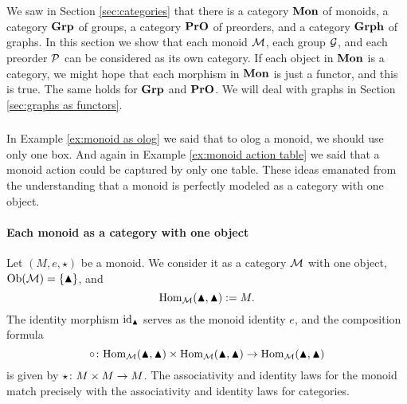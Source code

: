 

\section{}


\subsection{}\label{sec:mon grp pro as cat}

We saw in Section \ref{sec:categories} that there is a category ${\bf Mon}$ of monoids, a category ${\bf Grp}$ of groups, a category ${\bf PrO}$ of preorders, and a category ${\bf Grph}$ of graphs. In this section we show that each monoid $\mathcal{M}$, each group $\mathcal{G}$, and each preorder $\mathcal{P}$ can be considered as its own category. If each object in ${\bf Mon}$ is a category, we might hope that each morphism in ${\bf Mon}$ is just a functor, and this is true. The same holds for ${\bf Grp}$ and ${\bf PrO}$. We will deal with graphs in Section \ref{sec:graphs as functors}.


\subsubsection{}\label{sec:monoids as cats}

In Example \ref{ex:monoid as olog} we said that to olog a monoid, we should use only one box. And again in Example \ref{ex:monoid action table} we said that a monoid action could be captured by only one table. These ideas emanated from the understanding that a monoid is perfectly modeled as a category with one object. 

\paragraph{Each monoid as a category with one object}

Let $(M,e,\star)$ be a monoid. We consider it as a category $\mathcal{M}$ with one object, $\textnormal{Ob}(\mathcal{M})=\{\blacktriangle\}$, and $$\textnormal{Hom}_\mathcal{M}(\blacktriangle,\blacktriangle):=M.$$ The identity morphism $\textnormal{id}_\blacktriangle$ serves as the monoid identity $e$, and the composition formula $$\circ\colon\textnormal{Hom}_\mathcal{M}(\blacktriangle,\blacktriangle)\times\textnormal{Hom}_\mathcal{M}(\blacktriangle,\blacktriangle)\rightarrow\textnormal{Hom}_\mathcal{M}(\blacktriangle,\blacktriangle)$$ is given by $\star\colon M\times M\rightarrow M$. The associativity and identity laws for the monoid match precisely with the associativity and identity laws for categories.

